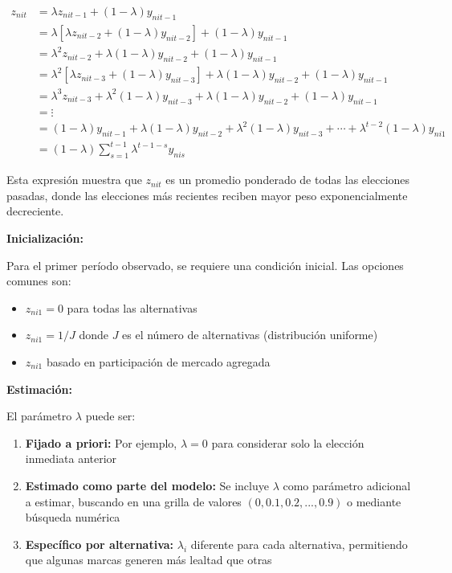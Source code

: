 \documentclass[
]{book}
\providecommand{\tightlist}{%
  \setlength{\itemsep}{0pt}\setlength{\parskip}{0pt}}
\begin{document}
\[
\begin{aligned}
z_{nit} &= \lambda z_{nit-1} + (1-\lambda) y_{nit-1}\\
&= \lambda[\lambda z_{nit-2} + (1-\lambda)y_{nit-2}] + (1-\lambda)y_{nit-1}\\
&= \lambda^2 z_{nit-2} + \lambda(1-\lambda)y_{nit-2} + (1-\lambda)y_{nit-1}\\
&= \lambda^2[\lambda z_{nit-3} + (1-\lambda)y_{nit-3}] + \lambda(1-\lambda)y_{nit-2} + (1-\lambda)y_{nit-1}\\
&= \lambda^3 z_{nit-3} + \lambda^2(1-\lambda)y_{nit-3} + \lambda(1-\lambda)y_{nit-2} + (1-\lambda)y_{nit-1}\\
&= \vdots\\
&= (1-\lambda)y_{nit-1} + \lambda(1-\lambda)y_{nit-2} + \lambda^2(1-\lambda)y_{nit-3} + \cdots + \lambda^{t-2}(1-\lambda)y_{ni1}\\
&= (1-\lambda)\sum_{s=1}^{t-1} \lambda^{t-1-s} y_{nis}
\end{aligned}
\]

Esta expresión muestra que \(z_{nit}\) es un promedio ponderado de todas las elecciones pasadas, donde las elecciones más recientes reciben mayor peso exponencialmente decreciente.

\textbf{Inicialización:}

Para el primer período observado, se requiere una condición inicial. Las opciones comunes son:

\begin{itemize}
\tightlist
\item
  \(z_{ni1} = 0\) para todas las alternativas
\item
  \(z_{ni1} = 1/J\) donde \(J\) es el número de alternativas (distribución uniforme)
\item
  \(z_{ni1}\) basado en participación de mercado agregada
\end{itemize}

\textbf{Estimación:}

El parámetro \(\lambda\) puede ser:

\begin{enumerate}
\def\labelenumi{\arabic{enumi}.}
\tightlist
\item
  \textbf{Fijado a priori:} Por ejemplo, \(\lambda = 0\) para considerar solo la elección inmediata anterior
\item
  \textbf{Estimado como parte del modelo:} Se incluye \(\lambda\) como parámetro adicional a estimar, buscando en una grilla de valores \((0, 0.1, 0.2, ..., 0.9)\) o mediante búsqueda numérica
\item
  \textbf{Específico por alternativa:} \(\lambda_i\) diferente para cada alternativa, permitiendo que algunas marcas generen más lealtad que otras
\end{enumerate}
\end{document}
